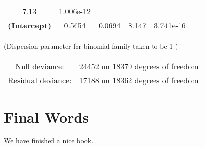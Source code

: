 \documentclass[]{book}
\theoremstyle{definition}
\theoremstyle{definition}
\theoremstyle{remark}
\begin{document}
\begin{longtable}[]{@{}ccccc@{}}
\begin{minipage}[t]{0.12\columnwidth}
7.13\strut
\end{minipage} & \begin{minipage}[t]{0.12\columnwidth}\centering\strut
1.006e-12\strut
\end{minipage}\tabularnewline
\begin{minipage}[t]{0.30\columnwidth}\centering\strut
\textbf{(Intercept)}\strut
\end{minipage} & \begin{minipage}[t]{0.13\columnwidth}\centering\strut
0.5654\strut
\end{minipage} & \begin{minipage}[t]{0.16\columnwidth}\centering\strut
0.0694\strut
\end{minipage} & \begin{minipage}[t]{0.12\columnwidth}\centering\strut
8.147\strut
\end{minipage} & \begin{minipage}[t]{0.12\columnwidth}\centering\strut
3.741e-16\strut
\end{minipage}\tabularnewline
\bottomrule
\end{longtable}

(Dispersion parameter for binomial family taken to be 1 )

\begin{longtable}[]{@{}cl@{}}
\toprule
\begin{minipage}[t]{0.25\columnwidth}\centering\strut
Null deviance:\strut
\end{minipage} & \begin{minipage}[t]{0.35\columnwidth}\raggedright\strut
24452 on 18370 degrees of freedom\strut
\end{minipage}\tabularnewline
\begin{minipage}[t]{0.25\columnwidth}\centering\strut
Residual deviance:\strut
\end{minipage} & \begin{minipage}[t]{0.35\columnwidth}\raggedright\strut
17188 on 18362 degrees of freedom\strut
\end{minipage}\tabularnewline
\bottomrule
\end{longtable}

\chapter{Final Words}\label{final-words}

We have finished a nice book.


\end{document}
